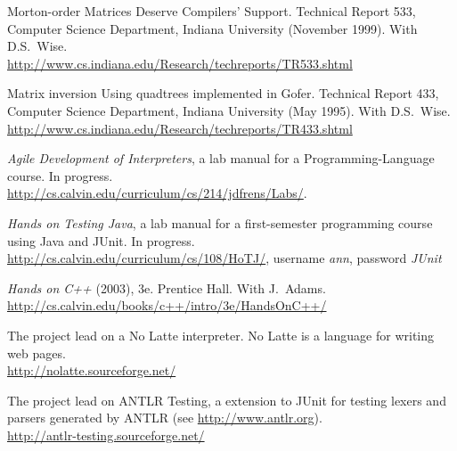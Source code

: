 \documentclass[ComputerScience]{vita}
\newcommand{\duphref}[1]{\href{#1}{#1}}
\begin{document}
\begin{vita}
\begin{Publications}
\begin{Papers at Refereed Conferences}
  \end{Papers at Refereed Conferences}

  \begin{Technical Reports}

  \item Morton-order Matrices Deserve Compilers' Support. Technical Report 533, Computer Science Department, Indiana University (November 1999).  With D.S.~Wise.  \\\duphref{http://www.cs.indiana.edu/Research/techreports/TR533.shtml}

  \item Matrix inversion Using quadtrees implemented in Gofer.  Technical Report 433, Computer Science Department, Indiana University (May 1995).  With D.S.~Wise.  \\\duphref{http://www.cs.indiana.edu/Research/techreports/TR433.shtml}

  \end{Technical Reports}

  \begin{labmanuals}
  
  \item \textit{Agile Development of Interpreters}, a lab manual for a Programming-Language course.  In progress.  \\\duphref{http://cs.calvin.edu/curriculum/cs/214/jdfrens/Labs/}.
  
  \item \textit{Hands on Testing Java}, a lab manual for a first-semester programming course using Java and JUnit.  In progress.  \\\duphref{http://cs.calvin.edu/curriculum/cs/108/HoTJ/}, username \emph{ann}, password \emph{JUnit}

  \item \textit{Hands on C++} (2003), 3e.  Prentice Hall.  With J.\ Adams.  \\\duphref{http://cs.calvin.edu/books/c++/intro/3e/HandsOnC++/}

  \end{labmanuals}

\end{Publications}

\begin{software}
  \item The project lead on a No Latte interpreter.  No Latte is a language for writing web pages.  \\\duphref{http://nolatte.sourceforge.net/}
  
  \item The project lead on ANTLR Testing, a extension to JUnit for testing lexers and parsers generated by ANTLR (see \duphref{http://www.antlr.org}).  \\\duphref{http://antlr-testing.sourceforge.net/}


\end{software}
\end{vita}
\end{document}
